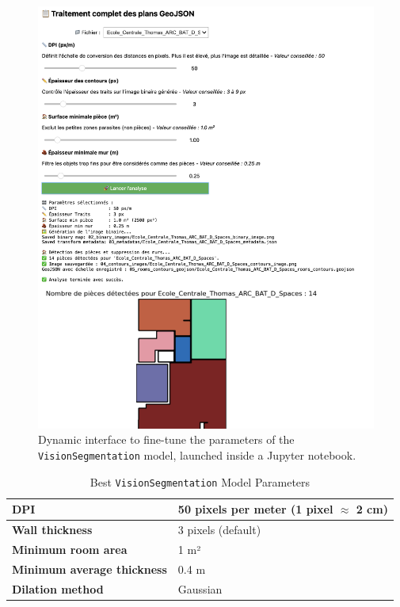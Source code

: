 \documentclass[11pt]{article}
\begin{document}
\begin{figure}[hp!]
    \centering
    \includegraphics[width=1\linewidth]{figures/interface.png}
    \caption{Dynamic interface to fine-tune the parameters of the \texttt{VisionSegmentation} model,
    launched inside a Jupyter notebook.}
    \label{fig:interface}
\end{figure} 


\begin{table}[htb!]
    \centering
    \begin{tabular}{|l|l|}
        \hline
        \textbf{DPI} & 50 pixels per meter (1 pixel $\approx$ 2 cm) \\ \hline
        \textbf{Wall thickness} & 3 pixels (default) \\ \hline
        \textbf{Minimum room area} & 1 m² \\ \hline
        \textbf{Minimum average thickness} & 0.4 m \\ \hline
        \textbf{Dilation method} & Gaussian \\ \hline
    \end{tabular}
    \caption{Best \texttt{VisionSegmentation} Model Parameters}
    \label{tab:CV_model_checkpoint}
\end{table}
\end{document}
